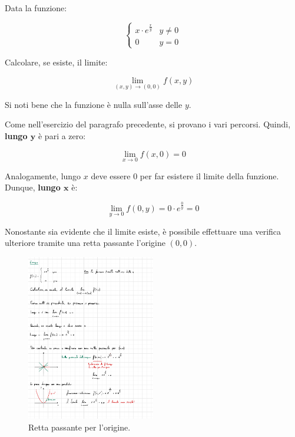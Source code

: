 \documentclass[a4paper]{article}
\begin{document}
	Data la funzione:
	
	\begin{equation*}
		\begin{cases}
			x \cdot e^{\frac{x}{y}}	& y \ne 0 \\
			0						& y = 0
		\end{cases}
	\end{equation*}

	\noindent
	Calcolare, se esiste, il limite:
	
	\begin{equation*}
		\lim_{\left(x,y\right) \rightarrow \left(0,0\right)} f\left(x,y\right)
	\end{equation*}

	\noindent
	Si noti bene che la funzione è nulla sull'asse delle $y$.\newline
	
	\noindent
	Come nell'esercizio del paragrafo precedente, si provano i vari percorsi. Quindi, \textbf{lungo $\boldsymbol{y}$} è pari a zero:
	
	\begin{equation*}
		\lim_{x \rightarrow 0} f\left(x,0\right) = 0
	\end{equation*}

	\noindent
	Analogamente, lungo $x$ deve essere $0$ per far esistere il limite della funzione. Dunque, \textbf{lungo $\boldsymbol{x}$} è:
	
	\begin{equation*}
		\lim_{y \rightarrow 0} f\left(0,y\right) = 0 \cdot e^{\frac{0}{y}} = 0
	\end{equation*}

	\noindent
	Nonostante sia evidente che il limite esiste, è possibile effettuare una verifica ulteriore tramite una retta passante l'origine $\left(0,0\right)$.
	
	\begin{figure}[!htp]
		\centering
		\includegraphics[width=0.5\textwidth]{img/limiti_ex1.pdf}
		\caption{Retta passante per l'origine.}
	\end{figure}
\end{document}
